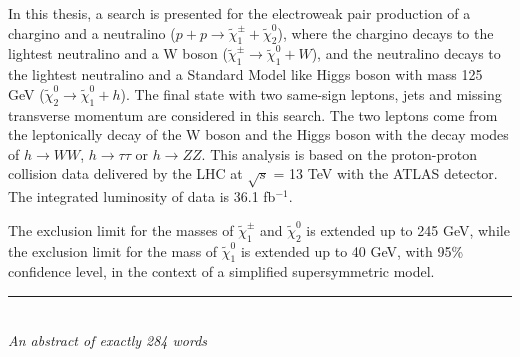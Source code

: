 In this thesis, a search is presented for the electroweak pair production of a chargino and a neutralino ($p + p \rightarrow \tilde{\chi}_1^\pm + \tilde{\chi}_2^0$),
where the chargino decays to the lightest neutralino and a W boson ($\tilde{\chi}_1^\pm \rightarrow \tilde{\chi}_1^0 + W$),
and the neutralino decays to the lightest neutralino and a Standard Model like Higgs boson with mass 125 GeV ($\tilde{\chi}_2^0 \rightarrow \tilde{\chi}_1^0 + h$).
The final state with two same-sign leptons, jets and missing transverse momentum are considered in this search.
The two leptons come from the leptonically decay of the W boson and the Higgs boson with the decay modes of  $h \rightarrow WW$, $h \rightarrow \tau \tau$ or $h \rightarrow ZZ$.
This analysis is based on the proton-proton collision data delivered by the LHC at $\sqrt{s}$ = 13 TeV with the ATLAS detector.
The integrated luminosity of data is 36.1 fb$^{-1}$.

The exclusion limit for the masses of $\tilde{\chi}_1^\pm$ and $\tilde{\chi}_2^0$ is extended up to 245 GeV, while the exclusion limit for the mass of $\tilde{\chi}_1^0$ is extended up to 40 GeV, with 95\% confidence level, in the context of a simplified supersymmetric model.

\bigskip

\begin{center}

\rule{6cm}{0.025cm}\\
{\slshape An abstract of exactly 284 words}

\end{center}
